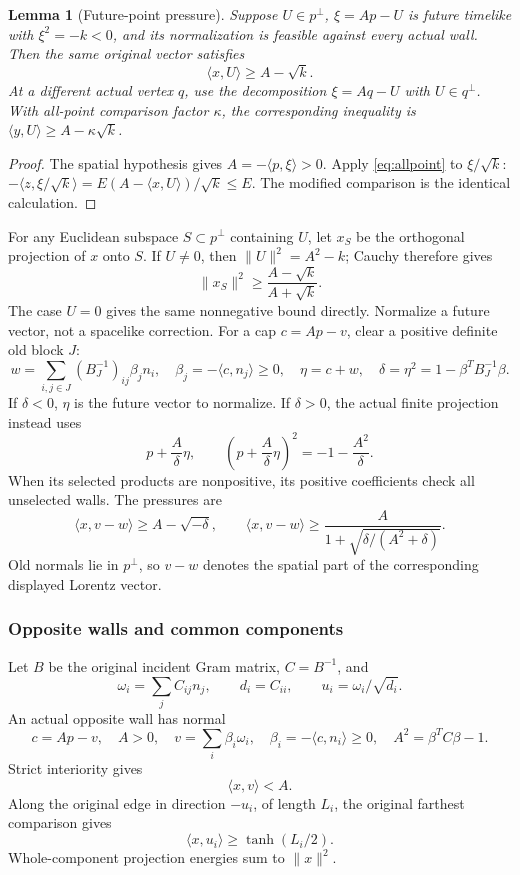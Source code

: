 \documentclass[11pt]{article}
\newtheorem{lemma}[theorem]{Lemma}
\theoremstyle{remark}\newtheorem{remark}[theorem]{Remark}
\numberwithin{equation}{section}
\newcommand{\ip}[2]{\langle #1,#2\rangle}
\newcommand{\norm}[1]{\lVert #1\rVert}
\begin{document}
\begin{lemma}[Future-point pressure]
\label{lem:pointpressure}Suppose \(U\in p^\perp\), \(\xi=A p-U\) is future timelike
with \(\xi^2=-k<0\),
and its normalization is feasible against every actual wall.
Then the same original vector satisfies
 \[
 \ip{x}{U}\geq A-\sqrt{k}.
\]
At a different actual vertex \(q\), use the decomposition
 \(\xi=Aq-U\) with \(U\in q^\perp\). With all-point comparison
factor \(\kappa\), the corresponding inequality is
 \(\ip{y}{U}\geq A-\kappa\sqrt{k}\).
\end{lemma}
\begin{proof}
The spatial hypothesis gives \(A=-\ip{p}{\xi}>0\).
Apply \eqref{eq:allpoint} to \(\xi/\sqrt{k}\):
\(-\ip{z}{\xi/\sqrt{k}}=E(A-\ip{x}{U})/\sqrt{k}\leq E\).
The modified comparison is the identical calculation.
\end{proof}
For any Euclidean subspace $S\subset p^\perp$ containing $U$, let $x_S$
be the orthogonal projection of $x$ onto $S$. If $U\ne0$, then
$\norm U^2=A^2-k$; Cauchy therefore gives
 \begin{equation}\label{eq:pointenergy}\norm{x_S}^2
 \geq\frac{A-\sqrt{k}}{A+\sqrt{k}}.
\end{equation}
The case $U=0$ gives the same nonnegative bound directly.
Normalize a future vector, not a spacelike correction.
For a cap \(c=A p-v\), clear a positive definite old block \(J\):
\[
 w=\sum_{i,j\in J}(B_J^{-1})_{ij}\beta_j n_i,\quad
 \beta_j=-\ip{c}{n_j}\geq0,\quad
 \eta=c+w,\quad \delta=\eta^2=1-\beta^TB_J^{-1}\beta.
\]
If \(\delta<0\), \(\eta\) is the future vector to normalize.
If \(\delta>0\), the actual finite projection instead uses
 \[
 p+\frac{A}{\delta}\eta,\qquad
 \left(p+\frac{A}{\delta}\eta\right)^2=-1-\frac{A^2}{\delta}.
\]
When its selected products are nonpositive, its positive
coefficients check all unselected walls. The pressures are
 \begin{equation}
\label{eq:corepressure}\ip{x}{v-w}\geq A-\sqrt{-\delta},\qquad
 \ip{x}{v-w}\geq
 \frac{A}{1+\sqrt{\delta/(A^2+\delta)}}.
\end{equation}
Old normals lie in \(p^\perp\), so \(v-w\) denotes the spatial
part of the corresponding displayed Lorentz vector.

\subsubsection{Opposite walls and common components}
Let \(B\) be the original incident Gram matrix, \(C=B^{-1}\), and
 \[
 \omega_i=\sum_j C_{ij}n_j,\qquad
 d_i=C_{ii},\qquad u_i=\omega_i/\sqrt{d_i}.
\]
An actual opposite wall has normal
 \[
 c=A p-v,\quad A>0,\quad
 v=\sum_i\beta_i\omega_i,\quad \beta_i=-\ip{c}{n_i}\geq0,\quad
 A^2=\beta^TC\beta-1.
\]
Strict interiority gives
 \begin{equation}\label{eq:actualinterior}\ip{x}{v}<A.
\end{equation}
Along the original edge in direction \(-u_i\), of length \(L_i\),
the original farthest comparison gives
 \begin{equation}
\label{eq:edge}\ip{x}{u_i}\geq\tanh(L_i/2).
\end{equation}
Whole-component projection energies sum to \(\norm{x}^2\).
\end{document}
